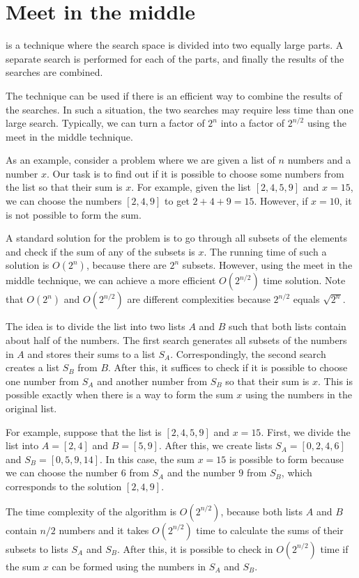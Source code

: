 \section{Meet in the middle}


 is a technique
where the search space is divided into
two equally large parts.
A separate search is performed
for each of the parts,
and finally the results of the searches are combined.

The technique can be used
if there is an efficient way to combine the
results of the searches.
In such a situation, the two searches may require less
time than one large search.
Typically, we can turn a factor of $2^n$
into a factor of $2^{n/2}$ using the meet in the
middle technique.

As an example, consider a problem where
we are given a list of $n$ numbers and
a number $x$.
Our task is to find out if it is possible
to choose some numbers from the list so that
their sum is $x$.
For example, given the list $[2,4,5,9]$ and $x=15$,
we can choose the numbers $[2,4,9]$ to get $2+4+9=15$.
However, if $x=10$,
it is not possible to form the sum.

A standard solution for the problem is to
go through all subsets of the elements and
check if the sum of any of the subsets is $x$.
The running time of such a solution is $O(2^n)$,
because there are $2^n$ subsets.
However, using the meet in the middle technique,
we can achieve a more efficient $O(2^{n/2})$ time solution.
Note that $O(2^n)$ and $O(2^{n/2})$ are different
complexities because $2^{n/2}$ equals $\sqrt{2^n}$.

The idea is to divide the list into
two lists $A$ and $B$ such that both
lists contain about half of the numbers.
The first search generates all subsets
of the numbers in $A$ and stores their sums
to a list $S_A$.
Correspondingly, the second search creates
a list $S_B$ from $B$.
After this, it suffices to check if it is possible
to choose one number from $S_A$ and another
number from $S_B$ so that their sum is $x$.
This is possible exactly when there is a way to
form the sum $x$ using the numbers in the original list.

For example, suppose that the list is $[2,4,5,9]$ and $x=15$.
First, we divide the list into $A=[2,4]$ and $B=[5,9]$.
After this, we create lists
$S_A=[0,2,4,6]$ and $S_B=[0,5,9,14]$.
In this case, the sum $x=15$ is possible to form
because we can choose the number $6$ from $S_A$
and the number $9$ from $S_B$,
which corresponds to the solution $[2,4,9]$.

The time complexity of the algorithm is $O(2^{n/2})$,
because both lists $A$ and $B$ contain $n/2$ numbers
and it takes $O(2^{n/2})$ time to calculate the sums of
their subsets to lists $S_A$ and $S_B$.
After this, it is possible to check in 
$O(2^{n/2})$ time if the sum $x$ can be formed
using the numbers in $S_A$ and $S_B$.